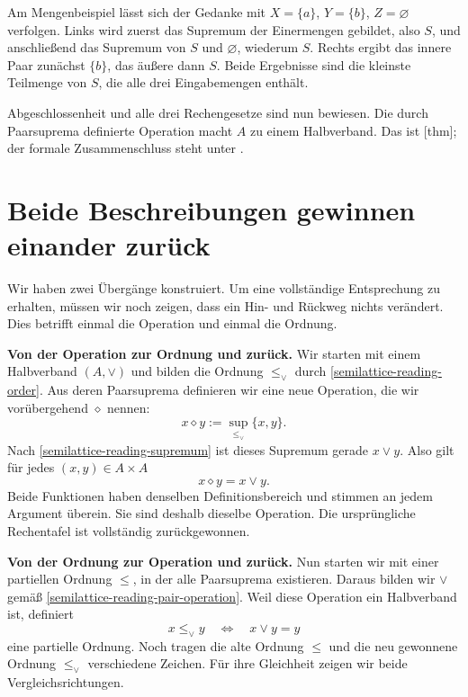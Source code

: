 Am Mengenbeispiel lässt sich der Gedanke mit
\(X=\{a\}\), \(Y=\{b\}\), \(Z=\varnothing\) verfolgen.
Links wird zuerst das Supremum der Einermengen gebildet, also
\(S\), und anschließend das Supremum von \(S\) und
\(\varnothing\), wiederum \(S\). Rechts ergibt das innere
Paar zunächst \(\{b\}\), das äußere dann \(S\).
Beide Ergebnisse sind die kleinste Teilmenge von \(S\), die
alle drei Eingabemengen enthält.

Abgeschlossenheit und alle drei Rechengesetze sind nun bewiesen.
Die durch Paarsuprema definierte Operation macht \(A\) zu einem
Halbverband. Das ist
[thm]; der formale
Zusammenschluss steht unter
.

\par{}
\section*{Beide Beschreibungen gewinnen einander zurück}
\hypertarget{semilattice.reading.recovery}{}

Wir haben zwei Übergänge konstruiert. Um eine vollständige
Entsprechung zu erhalten, müssen wir noch zeigen, dass ein
Hin- und Rückweg nichts verändert. Dies betrifft einmal die
Operation und einmal die Ordnung.

\medskip\noindent\textbf{Von der Operation zur Ordnung und zurück.}
Wir starten mit einem Halbverband \((A,\vee)\) und bilden
die Ordnung \(\leq_\vee\) durch
\eqref{semilattice-reading-order}. Aus deren Paarsuprema
definieren wir eine neue Operation, die wir vorübergehend
\(\diamond\) nennen:
\[
  x\diamond y:=\sup_{\leq_\vee}\{x,y\}.
\]
Nach \eqref{semilattice-reading-supremum} ist dieses Supremum
gerade \(x\vee y\). Also gilt für jedes \((x,y)\in A\times A\)
\[
  x\diamond y=x\vee y.
\]
Beide Funktionen haben denselben Definitionsbereich und stimmen
an jedem Argument überein. Sie sind deshalb dieselbe Operation.
Die ursprüngliche Rechentafel ist vollständig zurückgewonnen.

\medskip\noindent\textbf{Von der Ordnung zur Operation und zurück.}
Nun starten wir mit einer partiellen Ordnung \(\leq\), in der
alle Paarsuprema existieren. Daraus bilden wir \(\vee\) gemäß
\eqref{semilattice-reading-pair-operation}. Weil diese Operation
ein Halbverband ist, definiert
\[
  x\leq_\vee y\quad\Longleftrightarrow\quad x\vee y=y
\]
eine partielle Ordnung. Noch tragen die alte Ordnung \(\leq\)
und die neu gewonnene Ordnung \(\leq_\vee\) verschiedene Zeichen.
Für ihre Gleichheit zeigen wir beide Vergleichsrichtungen.

